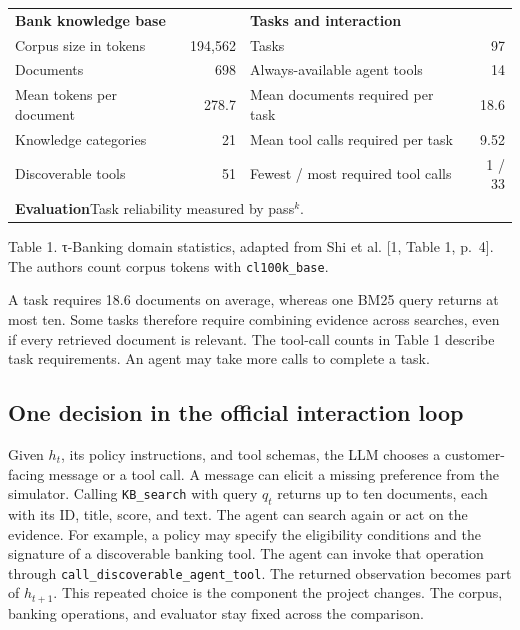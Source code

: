 \documentclass{article}
\begin{document}
\begin{center}\small
\begin{tabular}{@{}lr@{\hspace{1.5em}}lr@{}}
\hline
\multicolumn{2}{l}{\textbf{Bank knowledge base}} & \multicolumn{2}{l}{\textbf{Tasks and interaction}}\\
Corpus size in tokens & 194,562 & Tasks & 97\\
Documents & 698 & Always-available agent tools & 14\\
Mean tokens per document & 278.7 & Mean documents required per task & 18.6\\
Knowledge categories & 21 & Mean tool calls required per task & 9.52\\
Discoverable tools & 51 & Fewest / most required tool calls & 1 / 33\\
\hline
\multicolumn{4}{l}{\textbf{Evaluation}\quad Task reliability measured by pass$^k$.}\\
\hline
\end{tabular}\par
Table 1. τ-Banking domain statistics, adapted from Shi et al. [1, Table 1, p.~4].\\
The authors count corpus tokens with \texttt{cl100k\_base}.
\end{center}
A task requires 18.6 documents on average, whereas one BM25 query returns at most ten. Some tasks therefore require combining evidence across searches, even if every retrieved document is relevant. The tool-call counts in Table 1 describe task requirements. An agent may take more calls to complete a task.

\subsection{One decision in the official interaction loop}
Given $h_t$, its policy instructions, and tool schemas, the LLM chooses a customer-facing message or a tool call. A message can elicit a missing preference from the simulator. Calling \texttt{KB\_search} with query $q_t$ returns up to ten documents, each with its ID, title, score, and text. The agent can search again or act on the evidence. For example, a policy may specify the eligibility conditions and the signature of a discoverable banking tool. The agent can invoke that operation through \texttt{call\_discoverable\_agent\_tool}. The returned observation becomes part of $h_{t+1}$. This repeated choice is the component the project changes. The corpus, banking operations, and evaluator stay fixed across the comparison.
\end{document}
